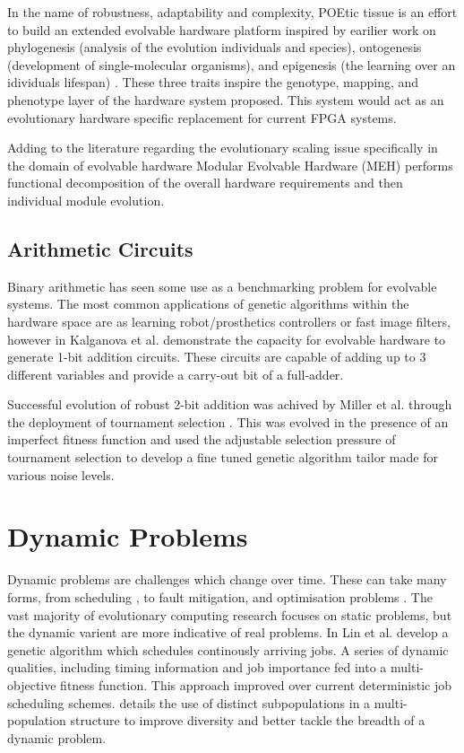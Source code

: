 In the name of robustness, adaptability and complexity, POEtic tissue
\cite{Tyrrell:2003:PTI:1766731.1766747} is
an effort to build an extended evolvable hardware platform inspired by
earilier work on phylogenesis (analysis of the evolution individuals and species),
ontogenesis (development of single-molecular organisms), and epigenesis
(the learning over an idividuals lifespan) \cite{10.1007/3-540-63173-9_37}.
These three traits inspire the genotype, mapping, and phenotype layer of the
hardware system proposed. This system would act as an evolutionary hardware
specific replacement for current FPGA systems.

Adding to the literature regarding the evolutionary scaling issue specifically
in the domain of evolvable hardware
Modular Evolvable Hardware (MEH) \cite{1299561} performs functional decomposition
of the overall hardware requirements and then individual module evolution.

\subsection{Arithmetic Circuits}

Binary arithmetic has seen some use as a benchmarking problem for evolvable systems.
The most common applications of genetic algorithms within the hardware space
are as learning robot/prosthetics controllers or fast image filters, however
in \cite{Miller_multiple-valuedcombinational} Kalganova et al. demonstrate the
capacity for evolvable hardware to generate 1-bit addition circuits. These
circuits are capable of adding up to 3 different variables and provide a carry-out
bit of a full-adder.

Successful evolution of robust 2-bit addition was achived by Miller et al. through
the deployment of tournament selection \cite{TournamentAdder}. This was evolved
in the presence of an imperfect fitness function and used the adjustable selection
pressure of tournament selection to develop a fine tuned genetic algorithm tailor
made for various noise levels.

\section{Dynamic Problems}

Dynamic problems are challenges which change over time. These can take many
forms, from scheduling \cite{LIN1997AGA}, to fault mitigation, and optimisation problems
\cite{Branke2003}. The vast majority of evolutionary computing research focuses on
static problems, but the dynamic varient are more indicative of real problems.
In \cite{LIN1997AGA} Lin et al. develop a genetic algorithm
which schedules continously arriving jobs. A series of dynamic qualities, including
timing information and job importance fed into a multi-objective fitness function. This
approach improved over current deterministic job scheduling schemes. \cite{Branke2003}
details the use of distinct subpopulations in a multi-population structure to
improve diversity and better tackle the breadth of a dynamic problem.

